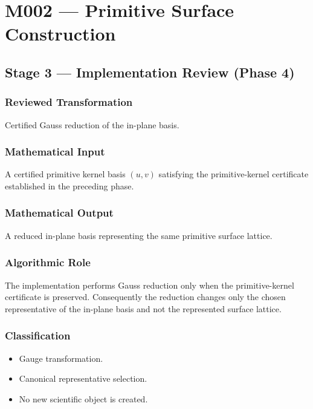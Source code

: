 
\chapter{M002 --- Primitive Surface Construction}

\section{Stage 3 --- Implementation Review (Phase 4)}

\subsection{Reviewed Transformation}

Certified Gauss reduction of the in-plane basis.

\subsection{Mathematical Input}

A certified primitive kernel basis $(u,v)$ satisfying the primitive-kernel
certificate established in the preceding phase.

\subsection{Mathematical Output}

A reduced in-plane basis representing the same primitive surface lattice.

\subsection{Algorithmic Role}

The implementation performs Gauss reduction only when the primitive-kernel
certificate is preserved. Consequently the reduction changes only the
chosen representative of the in-plane basis and not the represented
surface lattice.

\subsection{Classification}

\begin{itemize}
\item Gauge transformation.
\item Canonical representative selection.
\item No new scientific object is created.
\end{itemize}

